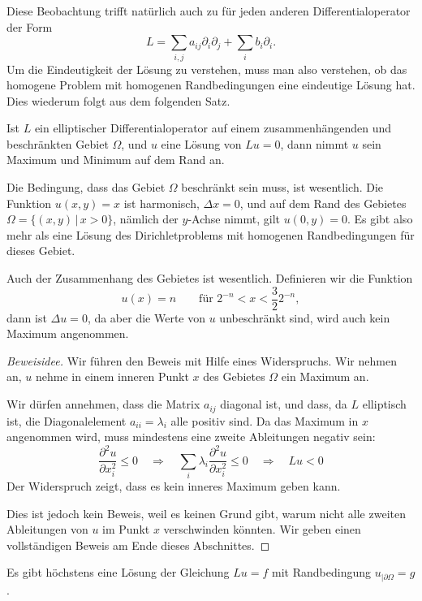 Diese Beobachtung trifft natürlich auch zu für jeden anderen
Differentialoperator der Form
\[
L=\sum_{i,j}a_{ij}\partial_i\partial_j+\sum_i b_i\partial_i.
\]
Um die Eindeutigkeit der Lösung zu verstehen, muss man also verstehen,
ob das homogene Problem mit homogenen Randbedingungen eine
eindeutige Lösung hat. Dies wiederum folgt aus dem folgenden Satz.

\begin{satz}
\label{maximumprinzip}
Ist $L$ ein elliptischer Differentialoperator auf einem zusammenhängenden
und beschränkten Gebiet $\Omega$,
und $u$ eine Lösung von $Lu=0$,
dann nimmt $u$ sein Maximum und Minimum auf dem Rand an.
\end{satz}

Die Bedingung, dass das Gebiet $\Omega$ beschränkt sein muss, ist
wesentlich.
Die Funktion $u(x,y)=x$ ist harmonisch, $\Delta x=0$, und auf
dem Rand des Gebietes $\Omega=\{(x,y)\,|\,x>0\}$, nämlich
der $y$-Achse nimmt, gilt $u(0,y)=0$.
Es gibt also mehr als eine Lösung des Dirichletproblems mit
homogenen Randbedingungen für dieses Gebiet.

Auch der Zusammenhang des Gebietes ist wesentlich.  Definieren wir
die Funktion 
\[
u(x)=n\qquad\text{für $2^{-n} < x < \frac{3}{2}2^{-n}$},
\]
dann ist $\Delta u=0$, da aber die Werte von $u$ unbeschränkt sind,
wird auch kein Maximum angenommen.

\begin{proof}[Beweisidee]
Wir führen den Beweis mit Hilfe eines Widerspruchs. Wir nehmen
an, $u$ nehme in einem inneren Punkt $x$ des Gebietes $\Omega$ ein
Maximum an.

Wir dürfen annehmen, dass die Matrix $a_{ij}$ diagonal ist,
und dass,
da $L$ elliptisch ist, die Diagonalelement $a_{ii}=\lambda_i$
alle positiv sind. Da das Maximum in $x$ angenommen wird, muss
mindestens eine zweite Ableitungen negativ sein:
\[
\frac{\partial^2u}{\partial x_i^2}
\le 0
\quad
\Rightarrow
\quad
\sum_{i}\lambda_i \frac{\partial^2u}{\partial x_i^2} \le 0
\quad
\Rightarrow
\quad
Lu<0
\]
Der Widerspruch zeigt, dass es kein inneres Maximum geben kann.

Dies ist jedoch kein Beweis, weil es keinen Grund gibt, warum
nicht alle zweiten Ableitungen von $u$ im Punkt $x$ verschwinden
könnten. Wir geben einen vollständigen Beweis am Ende dieses
Abschnittes.
\end{proof}

\begin{satz}
Es gibt höchstens eine Lösung der Gleichung
$Lu=f$ 
mit Randbedingung
$u_{|\partial\Omega}=g$.
\end{satz}

